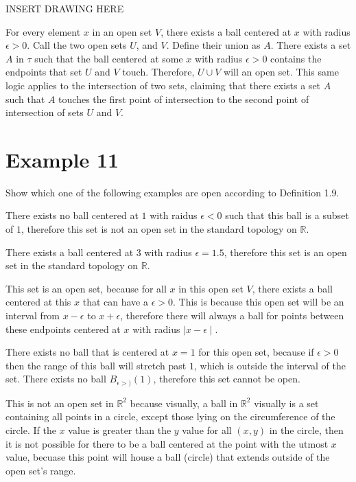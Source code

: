 \documentclass{report}
\begin{document}
INSERT DRAWING HERE


For every element $x$ in an open set $V$, there exists a ball centered at $x$ with radius $\epsilon > 0$. Call the two open sets $U$, and $V$. Define their union as $A$. There exists a set $A$ in $\tau$ such that the ball centered at some $x$ with radius $\epsilon > 0$ contains the endpoints that set $U$ and $V$ touch. Therefore, $U \cup V$ will an open set. This same logic applies to the intersection of two sets, claiming that there exists a set $A$ such that $A$ touches the first point of intersection to the second point of intersection of sets $U$ and $V$. 


\section{Example 11}
\begin{center} 
    Show which one of the following examples are open according to Definition 1.9. 
\end{center}

\sol There exists no ball centered at $1$ with raidus $\epsilon < 0$ such that this ball is a subset of ${1}$, therefore this set is not an open set in the standard topology on $\mathbb{R}$. 

\sol There exists a ball centered at $3$ with radius $\epsilon = 1.5$, therefore this set is an open set in the standard topology on $\mathbb{R}$.  

\sol This set is an open set, because for all $x$ in this open set $V$, there exists a ball centered at this $x$ that can have a $\epsilon > 0$. This is because this open set will be an interval from $x -  \epsilon$ to $x + \epsilon$, therefore there will always a ball for points between these endpoints centered at $x$ with radius $\mid x - \epsilon \mid$. 

\qs{1.11.d}{The interval $[0, 1)$ in $\mathbb{R}$.}
\sol There exists no ball that is centered at $x = 1$ for this open set, because if $\epsilon > 0$ then the range of this ball will stretch past $1$, which is outside the interval of the set. There exists no ball $B_{\epsilon > )}(1)$, therefore this set cannot be open.  

\sol This is not an open set in $\mathbb{R}^2$ because visually, a ball in $\mathbb{R}^2$ visually is a set containing all points in a circle, except those lying on the circumference of the circle. If the $x$ value is greater than the $y$ value for all $(x, y)$ in the circle, then it is not possible for there to be a ball centered at the point with the utmost $x$ value, becuase this point will house a ball (circle) that extends outside of the open set's range. 
\end{document}

